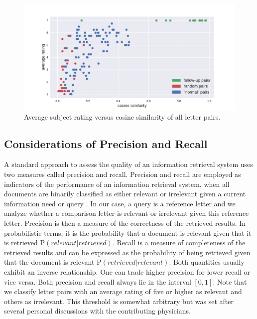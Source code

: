 \begin{figure}
	\includegraphics[width=\linewidth]{figures/rating_vs_similarity}
	\caption{Average subject rating versus cosine similarity of all letter pairs.}
	\label{fig:all_points}
\end{figure}


\subsection*{Considerations of Precision and Recall}
A standard approach to assess the quality of an information retrieval system uses two measures called precision and recall. Precision and recall are employed as indicators of the performance of an information retrieval system, when all documents are binarily classified as either relevant or irrelevant given a current information need or query \citep{Manning2008prerec}. In our case, a query is a reference letter and we analyze whether a comparison letter is relevant or irrelevant given this reference letter. Precision is then a measure of the correctness of the retrieved results. In probabilistic terms, it is the probability that a document is relevant given that it is retrieved P$(relevant|retrieved)$. Recall is a measure of completeness of the retrieved results and can be expressed as the probability of being retrieved given that the document is relevant P$(retrieved|relevant)$. Both quantities usually exhibit an inverse relationship. One can trade higher precision for lower recall or vice versa. Both precision and recall always lie in the interval $[0,1]$. Note that we classify letter pairs with an average rating of five or higher as relevant and others as irrelevant. This threshold is somewhat arbitrary but was set after several personal discussions with the contributing physicians.

